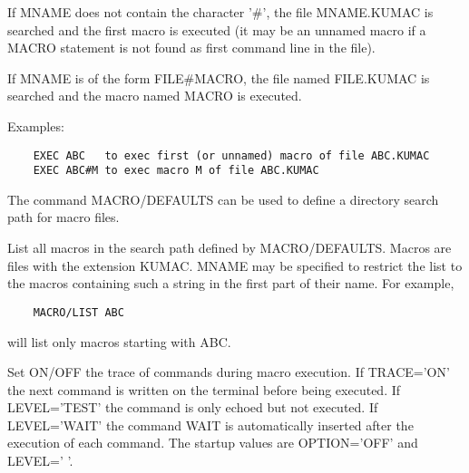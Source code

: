    \par
If MNAME does not contain the character '\#', the file MNAME.KUMAC is 
   searched and the first macro is executed (it may be an unnamed macro if a 
   MACRO statement is not found as first command line in the file).  

   \par
If MNAME is of the form FILE\#MACRO, the file named FILE.KUMAC is searched 
   and the macro named MACRO is executed.  

   \par
Examples:  
\begin{verbatim}
    EXEC ABC   to exec first (or unnamed) macro of file ABC.KUMAC
    EXEC ABC#M to exec macro M of file ABC.KUMAC
\end{verbatim}
\ENDVERB
   \par
The command MACRO/DEFAULTS can be used to define a directory search path 
   for macro files.  

\ENDCMD


\BEGARG
{}
\ENDARG

   \par
List all macros in the search path defined by MACRO/DEFAULTS.  Macros are 
   files with the extension KUMAC.  MNAME may be specified to restrict the 
   list to the macros containing such a string in the first part of their 
   name.  For example, 
\begin{verbatim}
    MACRO/LIST ABC
\end{verbatim}
   \par
will list only macros starting with ABC.  

\ENDCMD


\BEGARG
{}
\ENDARG
{}
\ENDOPT
{}
\DEFOPT{\EMPTY}{}
\ENDOPT

   \par
Set ON/OFF the trace of commands during macro execution.  If TRACE='ON' the 
   next command is written on the terminal before being executed.  If 
   LEVEL='TEST' the command is only echoed but not executed.  If LEVEL='WAIT' 
   the command WAIT is automatically inserted after the execution of each 
   command.  The startup values are OPTION='OFF' and LEVEL=' '.  

